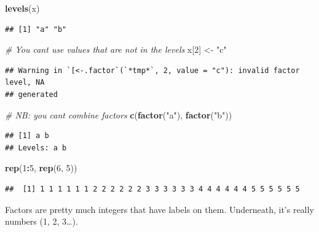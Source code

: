 \documentclass[
]{book}
\newenvironment{Shaded}{\begin{snugshade}}{\end{snugshade}}
\newcommand{\CommentTok}[1]{\textcolor[rgb]{0.56,0.35,0.01}{\textit{#1}}}
\newcommand{\DecValTok}[1]{\textcolor[rgb]{0.00,0.00,0.81}{#1}}
\newcommand{\FunctionTok}[1]{\textcolor[rgb]{0.13,0.29,0.53}{\textbf{#1}}}
\newcommand{\NormalTok}[1]{#1}
\newcommand{\OtherTok}[1]{\textcolor[rgb]{0.56,0.35,0.01}{#1}}
\newcommand{\SpecialCharTok}[1]{\textcolor[rgb]{0.81,0.36,0.00}{\textbf{#1}}}
\newcommand{\StringTok}[1]{\textcolor[rgb]{0.31,0.60,0.02}{#1}}
\begin{document}
\begin{Shaded}
\begin{Highlighting}[]
\FunctionTok{levels}\NormalTok{(x)}
\end{Highlighting}
\end{Shaded}

\begin{verbatim}
## [1] "a" "b"
\end{verbatim}

\begin{Shaded}
\begin{Highlighting}[]
\CommentTok{\# You can\textquotesingle{}t use values that are not in the levels}
\NormalTok{x[}\DecValTok{2}\NormalTok{] }\OtherTok{\textless{}{-}} \StringTok{"c"}
\end{Highlighting}
\end{Shaded}

\begin{verbatim}
## Warning in `[<-.factor`(`*tmp*`, 2, value = "c"): invalid factor level, NA
## generated
\end{verbatim}

\begin{Shaded}
\begin{Highlighting}[]
\CommentTok{\# NB: you can\textquotesingle{}t combine factors}
\FunctionTok{c}\NormalTok{(}\FunctionTok{factor}\NormalTok{(}\StringTok{"a"}\NormalTok{), }\FunctionTok{factor}\NormalTok{(}\StringTok{"b"}\NormalTok{))}
\end{Highlighting}
\end{Shaded}

\begin{verbatim}
## [1] a b
## Levels: a b
\end{verbatim}

\begin{Shaded}
\begin{Highlighting}[]
\FunctionTok{rep}\NormalTok{(}\DecValTok{1}\SpecialCharTok{:}\DecValTok{5}\NormalTok{, }\FunctionTok{rep}\NormalTok{(}\DecValTok{6}\NormalTok{, }\DecValTok{5}\NormalTok{))}
\end{Highlighting}
\end{Shaded}

\begin{verbatim}
##  [1] 1 1 1 1 1 1 2 2 2 2 2 2 3 3 3 3 3 3 4 4 4 4 4 4 5 5 5 5 5 5
\end{verbatim}

Factors are pretty much integers that have labels on them. Underneath, it's really numbers (1, 2, 3\ldots).
\end{document}
